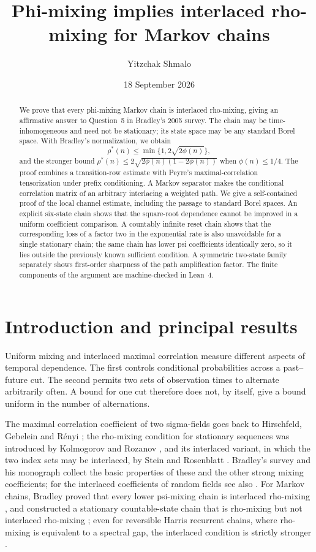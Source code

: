 \documentclass[11pt]{amsart}
\title[Phi-mixing and interlaced maximal correlation]{Phi-mixing implies interlaced rho-mixing for Markov chains}
\author{Yitzchak Shmalo}
\date{18 September 2026}
\numberwithin{equation}{section}
\theoremstyle{definition}
\begin{document}
\begin{abstract}
We prove that every phi-mixing Markov chain is interlaced rho-mixing, giving an affirmative answer to Question~5 in Bradley's 2005 survey. The chain may be time-inhomogeneous and need not be stationary; its state space may be any standard Borel space. With Bradley's normalization, we obtain
\[
\rho^*(n)\le \min\{1,2\sqrt{2\phi(n)}\},
\]
and the stronger bound $\rho^*(n)\le 2\sqrt{2\phi(n)(1-2\phi(n))}$ when $\phi(n)\le1/4$. The proof combines a transition-row estimate with Peyre's maximal-correlation tensorization under prefix conditioning. A Markov separator makes the conditional correlation matrix of an arbitrary interlacing a weighted path. We give a self-contained proof of the local channel estimate, including the passage to standard Borel spaces. An explicit six-state chain shows that the square-root dependence cannot be improved in a uniform coefficient comparison. A countably infinite reset chain shows that the corresponding loss of a factor two in the exponential rate is also unavoidable for a single stationary chain; the same chain has lower psi coefficients identically zero, so it lies outside the previously known sufficient condition. A symmetric two-state family separately shows first-order sharpness of the path amplification factor. The finite components of the argument are machine-checked in Lean~4.
\end{abstract}
\maketitle

\section{Introduction and principal results}

Uniform mixing and interlaced maximal correlation measure different aspects of temporal dependence. The first controls conditional probabilities across a past--future cut. The second permits two sets of observation times to alternate arbitrarily often. A bound for one cut therefore does not, by itself, give a bound uniform in the number of alternations.

The maximal correlation coefficient of two sigma-fields goes back to Hirschfeld, Gebelein and R\'enyi \cite{Renyi1959}; the rho-mixing condition for stationary sequences was introduced by Kolmogorov and Rozanov \cite{KolmogorovRozanov1960}, and its interlaced variant, in which the two index sets may be interlaced, by Stein \cite{Stein1972} and Rosenblatt \cite{Rosenblatt1972}. Bradley's survey \cite{Bradley2005} and his monograph \cite{Bradley2007} collect the basic properties of these and the other strong mixing coefficients; for the interlaced coefficients of random fields see also \cite{Bradley1993,Miller1994}. For Markov chains, Bradley proved that every lower psi-mixing chain is interlaced rho-mixing \cite{Bradley1997}, and constructed a stationary countable-state chain that is rho-mixing but not interlaced rho-mixing \cite{Bradley2001}; even for reversible Harris recurrent chains, where rho-mixing is equivalent to a spectral gap, the interlaced condition is strictly stronger \cite{Bradley2015}.
\end{document}
